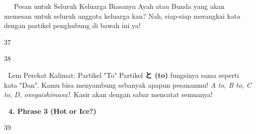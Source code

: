 \begin{lessonbox}{👨‍👩‍👧‍👦 Pesan untuk Seluruh Keluarga}
    Biasanya Ayah atau Bunda yang akan memesan untuk seluruh anggota keluarga kan? Nah, siap-siap merangkai kata dengan partikel penghubung di bawah ini ya!
\end{lessonbox}

\begin{convobox}{37}
    \noindent
       
      

    \vspace{1.5em}
\end{convobox}

\begin{convobox}{38}
    \noindent
       
      

    \vspace{1.5em}
\end{convobox}

\begin{lessonbox}{🔗 Lem Perekat Kalimat: Partikel "To"}
    Partikel \textbf{と (to)} fungsinya sama seperti kata "Dan". Kamu bisa menyambung sebanyak apapun pesananmu! \textit{A to, B to, C to, D, onegaishimasu!}. Kasir akan dengan sabar mencatat semuanya!
\end{lessonbox}

\vspace{1em}
\begin{tcolorbox}[colback=boxframe, colframe=boxframe, rounded corners, boxrule=0pt, arc=3mm, left=2mm, top=2mm, bottom=2mm]
    \Large \bfseries \color{white} 🥤 4. Phrase 3 (Hot or Ice?)
\end{tcolorbox}
\vspace{1em}

\begin{convobox}{39}
    \noindent
      
     

    \vspace{1.5em}
\end{convobox}

